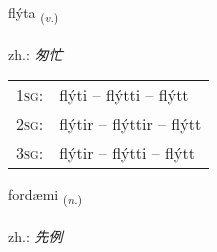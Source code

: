 \documentclass[frontgrid, backgrid]{flacards}\usepackage[]{graphicx}\usepackage[]{xcolor}
\begin{document}
\renewcommand{\flhead}{\vskip5pt \fboxsep=0pt {\small\bfseries\footnotesize Sagnorð | 动词}}
\renewcommand{\fcfoot}{\vskip5pt \fboxsep=0pt \hspace{2pt}{\small\bfseries\footnotesize 3K}}

\renewcommand{\blhead}{\vskip5pt {\small\bfseries\footnotesize Sagnorð | 动词 }}
\renewcommand{\bcfoot}{\vskip5pt \hspace{2pt}{\small\bfseries\footnotesize 3K}}


{flýta \small{\textsubscript{(\textit{v.})}} \\[1ex] %
\textphonetic{[fliːta]} \\
zh.: \emph{匆忙} \\  [2ex]
\renewcommand*{\arraystretch}{0.8}
\begin{tabular}{p{1cm}l}
\textsc{1sg}: & flýti -- flýtti -- flýtt \\ 
\textsc{2sg}: & flýtir -- flýttir -- flýtt \\ 
\textsc{3sg}: & flýtir -- flýtti -- flýtt \\ 
\end{tabular}
}

\renewcommand{\flhead}{\vskip5pt \fboxsep=0pt {\small\bfseries\footnotesize Nafnorð | 名词}}
\renewcommand{\fcfoot}{\vskip5pt \fboxsep=0pt \hspace{2pt}{\small\bfseries\footnotesize 3K}}

\renewcommand{\blhead}{\vskip5pt {\small\bfseries\footnotesize Nafnorð | 名词 }}
\renewcommand{\bcfoot}{\vskip5pt \hspace{2pt}{\small\bfseries\footnotesize 3K}}


{fordæmi \small{\textsubscript{(\textit{n.})}} \\[1ex] %
\textphonetic{[fɔrtaimɪ]} \\
zh.: \emph{先例} \\  [2ex]
\renewcommand*{\arraystretch}{0.8}
}
\end{document}
